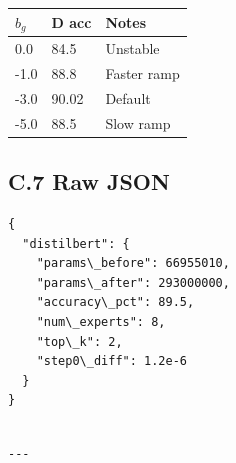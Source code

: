 \begin{table}[H]
\centering
\small
\begin{tabular}{lll}
\toprule
\textbf{$b_g$} & \textbf{D acc} & \textbf{Notes} \\
\midrule
0.0 & 84.5 & Unstable \\
-1.0 & 88.8 & Faster ramp \\
-3.0 & 90.02 & Default \\
-5.0 & 88.5 & Slow ramp \\
\bottomrule
\end{tabular}
\end{table}

\subsection{C.7 Raw JSON}

\begin{lstlisting}
{
  "distilbert": {
    "params\_before": 66955010,
    "params\_after": 293000000,
    "accuracy\_pct": 89.5,
    "num\_experts": 8,
    "top\_k": 2,
    "step0\_diff": 1.2e-6
  }
}
\end{lstlisting}
\begin{lstlisting}

---
\end{lstlisting}